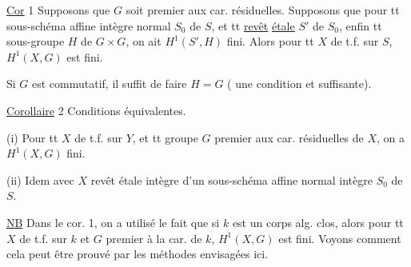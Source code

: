 \uline{Cor} 1 Supposons que $G$ soit premier aux car. résiduelles.
Supposons que pour tt sous-schéma affine intègre normal $S_0$ de $S$, et tt \uline{revêt} \uline{étale} $S'$  de $S_0$, enfin tt sous-groupe $H$ de $G\times G$, on ait $H^1(S',H)$ fini.
Alors pour tt $X$ de t.f. sur $S$, $H^1(X,G)$ est fini.

Si $G$ est commutatif, il suffit de faire $H=G$ ( une condition  et suffisante).

\uline{Corollaire} 2 Conditions équivalentes.

(i) Pour tt $X$ de t.f. sur $Y$, et tt groupe  $G$ premier aux car. résiduelles de $X$, on a $H^1(X,G)$ fini.

(ii)  Idem avec $X$ revêt  étale intègre d'un sous-schéma affine normal intègre $S_0$ de $S$.

\uline{NB} Dans le cor. 1, on a utilisé le fait que si $k$ est un corps alg. clos, alors pour tt $X$ de t.f. sur $k$ et $G$ premier à la car. de $k$, $H^1(X,G)$ est fini.
Voyons comment cela peut être prouvé par les méthodes envisagées ici.
